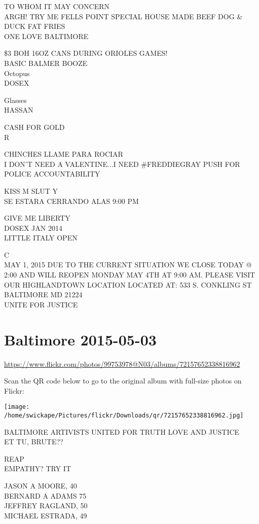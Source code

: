 \documentclass[10pt,letterpaper]{article}
\begin{document}
TO WHOM IT MAY CONCERN\\
ARGH!  TRY ME FELLS POINT SPECIAL HOUSE MADE BEEF DOG \& DUCK FAT FRIES\\
ONE LOVE BALTIMORE

\$3 BOH 16OZ CANS DURING ORIOLES GAMES!\\
BASIC BALMER BOOZE\\
Octopus\\
DOSEX

Glasses\\
HASSAN

CASH FOR GOLD\\
R

CHINCHES LLAME PARA ROCIAR\\
I DON'T NEED A VALENTINE...I NEED \#FREDDIEGRAY PUSH FOR POLICE ACCOUNTABILITY

KISS M SLUT Y\\
SE ESTARA CERRANDO ALAS 9:00 PM

GIVE ME LIBERTY\\
DOSEX JAN 2014\\
LITTLE ITALY OPEN

C\\
MAY 1, 2015  DUE TO THE CURRENT SITUATION WE CLOSE TODAY @ 2:00 AND WILL REOPEN MONDAY MAY 4TH AT 9:00 AM.  PLEASE VISIT OUR HIGHLANDTOWN LOCATION LOCATED AT: 533 S. CONKLING ST BALTIMORE MD 21224\\
UNITE FOR JUSTICE
\pagebreak

\section*{Baltimore 2015-05-03}

\url{https://www.flickr.com/photos/99753978@N03/albums/72157652338816962}

Scan the QR code below to go to the original album with full-size photos on Flickr:

\texttt{[image: /home/swickape/Pictures/flickr/Downloads/qr/72157652338816962.jpg]}
\pagebreak

BALTIMORE ARTIVISTS UNITED FOR TRUTH LOVE AND JUSTICE\\
ET TU, BRUTE??

REAP\\
EMPATHY?  TRY IT

JASON A MOORE, 40\\
BERNARD A ADAMS 75\\
JEFFREY RAGLAND, 50\\
MICHAEL ESTRADA, 49
\end{document}
